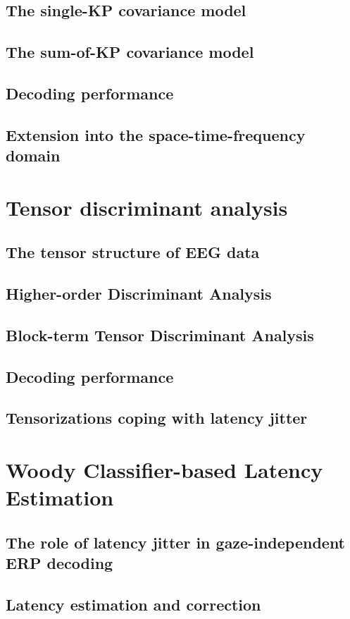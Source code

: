 \documentclass[draft]{book}
\begin{document}
\section{The single-KP covariance model}
\section{The sum-of-KP covariance model}
\section{Decoding performance}
\section{Extension into the space-time-frequency domain}

\chapter{Tensor discriminant analysis}
\section{The tensor structure of EEG data}
\section{Higher-order Discriminant Analysis}
\section{Block-term Tensor Discriminant Analysis}
\section{Decoding performance}
\section{Tensorizations coping with latency jitter}

\chapter{Woody Classifier-based Latency Estimation}
\section{The role of latency jitter in gaze-independent ERP decoding}
\section{Latency estimation and correction}
\end{document}
